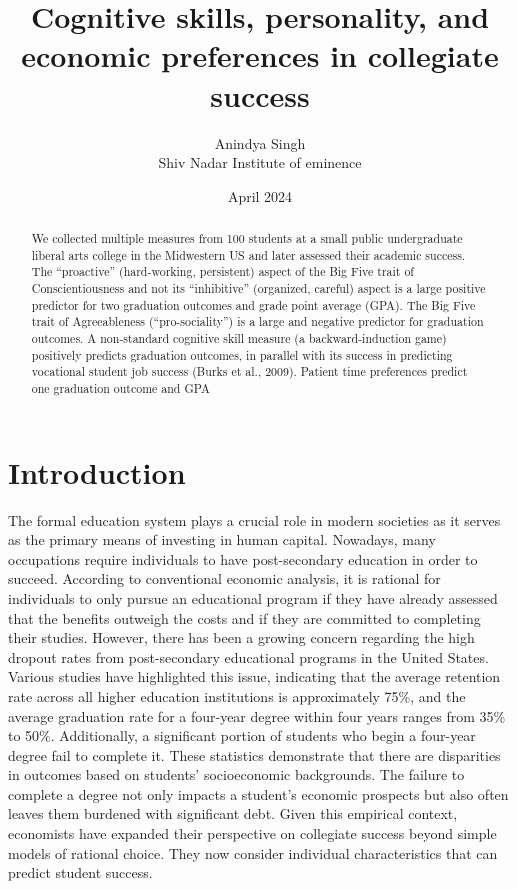 \documentclass[12pt,a4paper]{article}
\title{Cognitive skills, personality, and economic preferences in
collegiate success}
\author{Anindya Singh \\ \large Shiv Nadar Institute of eminence}
\date{April 2024}
\begin{document}
\maketitle

\newpage
\begin{abstract}
    We collected multiple measures from 100 students at a small public undergraduate liberal
arts college in the Midwestern US and later assessed their academic success. The “proactive” (hard-working, persistent) aspect of the Big Five trait of Conscientiousness and not its
“inhibitive” (organized, careful) aspect is a large positive predictor for two graduation outcomes and grade point average (GPA). The Big Five trait of Agreeableness (“pro-sociality”)
is a large and negative predictor for graduation outcomes. A non-standard cognitive skill
measure (a backward-induction game) positively predicts graduation outcomes, in parallel
with its success in predicting vocational student job success (Burks et al., 2009). Patient
time preferences predict one graduation outcome and GPA
\end{abstract}
\newpage
\section{Introduction}
The formal education system plays a crucial role in modern societies as it serves as the primary means of investing in human capital. Nowadays, many occupations require individuals to have post-secondary education in order to succeed. According to conventional economic analysis, it is rational for individuals to only pursue an educational program if they have already assessed that the benefits outweigh the costs and if they are committed to completing their studies. However, there has been a growing concern regarding the high dropout rates from post-secondary educational programs in the United States. Various studies have highlighted this issue, indicating that the average retention rate across all higher education institutions is approximately 75\%, and the average graduation rate for a four-year degree within four years ranges from 35\% to 50\%. Additionally, a significant portion of students who begin a four-year degree fail to complete it. These statistics demonstrate that there are disparities in outcomes based on students' socioeconomic backgrounds. The failure to complete a degree not only impacts a student's economic prospects but also often leaves them burdened with significant debt. Given this empirical context, economists have expanded their perspective on collegiate success beyond simple models of rational choice. They now consider individual characteristics that can predict student success.\cite{article2}
\end{document}
